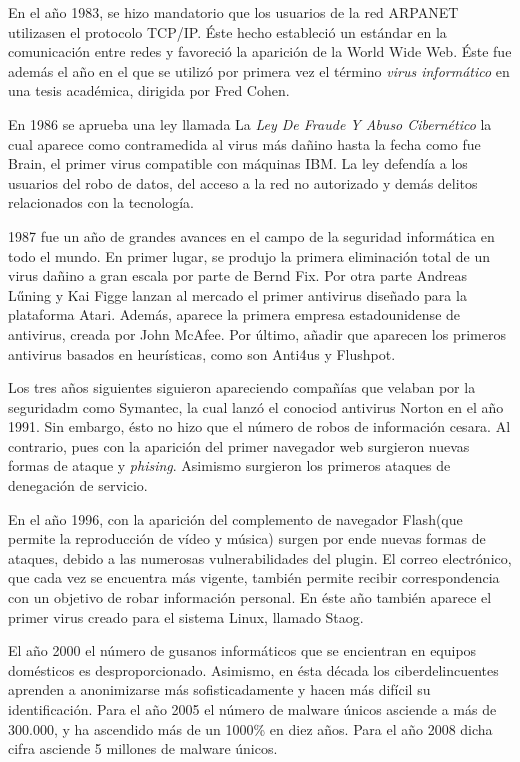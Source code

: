 En el año 1983, se hizo mandatorio que los usuarios de la red ARPANET
utilizasen el protocolo TCP/IP. Éste hecho estableció un estándar en
la comunicación entre redes y favoreció la aparición de la World Wide
Web.  Éste fue además el año en el que se utilizó por primera vez el
término \textit{virus informático} en una tesis académica, dirigida
por Fred Cohen.

En 1986 se aprueba una ley llamada La \textit{Ley De Fraude Y Abuso
  Cibernético } la cual aparece como contramedida al virus más dañino
hasta la fecha como fue Brain, el primer virus compatible con máquinas
IBM. La ley defendía a los usuarios del robo de datos, del acceso a la
red no autorizado y demás delitos relacionados con la tecnología.

1987 fue un año de grandes avances en el campo de la seguridad informática en todo el mundo.
En primer lugar, se produjo la primera eliminación total de un virus dañino a gran escala por parte de Bernd Fix. 
Por otra parte Andreas Lűning y Kai Figge lanzan al mercado el primer antivirus diseñado para la plataforma Atari.
Además, aparece la primera empresa estadounidense de antivirus, creada por John McAfee. 
Por último, añadir que aparecen los primeros antivirus basados en heurísticas, como son Anti4us y Flushpot.

Los tres años siguientes siguieron apareciendo compañías que velaban
por la seguridadm como Symantec, la cual lanzó el conociod antivirus
Norton en el año 1991.  Sin embargo, ésto no hizo que el número de
robos de información cesara. Al contrario, pues con la aparición del
primer navegador web surgieron nuevas formas de ataque y
\textit{phising}. Asimismo surgieron los primeros ataques de
denegación de servicio.

En el año 1996, con la aparición del complemento de navegador
Flash(que permite la reproducción de vídeo y música) surgen por ende
nuevas formas de ataques, debido a las numerosas vulnerabilidades del
plugin. El correo electrónico, que cada vez se encuentra más vigente,
también permite recibir correspondencia con un objetivo de robar
información personal. En éste año también aparece el primer virus
creado para el sistema Linux, llamado Staog.

El año 2000 el número de gusanos informáticos que se encientran en
equipos domésticos es desproporcionado. Asimismo, en ésta década los
ciberdelincuentes aprenden a anonimizarse más sofisticadamente y hacen
más difícil su identificación.  Para el año 2005 el número de malware
únicos asciende a más de 300.000, y ha ascendido más de un 1000\% en
diez años. Para el año 2008 dicha cifra asciende 5 millones de malware
únicos.

